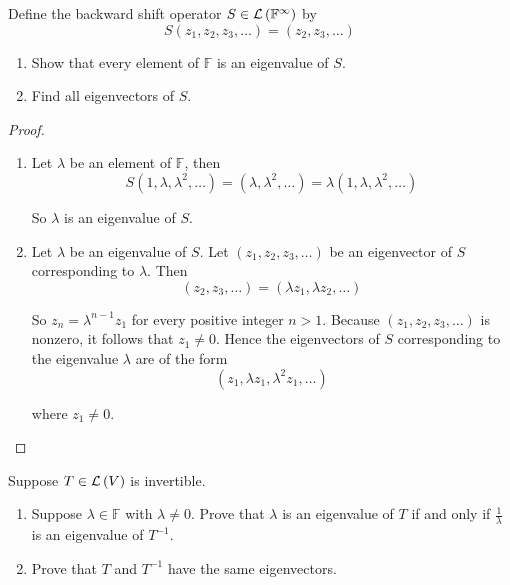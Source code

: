 \begin{exercise}
    Define the backward shift operator $S\in\mathcal{L}\left({\mathbb{F}^{\infty}}\right)$ by
    \[
        S(z_{1}, z_{2}, z_{3}, \ldots) = (z_{2}, z_{3}, \ldots)
    \]

    \begin{enumerate}[label={(\alph*)}]
        \item Show that every element of $\mathbb{F}$ is an eigenvalue of $S$.
        \item Find all eigenvectors of $S$.
    \end{enumerate}
\end{exercise}

\begin{proof}
    \begin{enumerate}[label={(\alph*)}]
        \item Let $\lambda$ be an element of $\mathbb{F}$, then
              \[
                  S(1, \lambda, \lambda^{2}, \ldots) = (\lambda, \lambda^{2}, \ldots) = \lambda (1, \lambda, \lambda^{2}, \ldots)
              \]

              So $\lambda$ is an eigenvalue of $S$.
        \item Let $\lambda$ be an eigenvalue of $S$. Let $(z_{1}, z_{2}, z_{3}, \ldots)$ be an eigenvector of $S$ corresponding to $\lambda$. Then
              \[
                  (z_{2}, z_{3}, \ldots) = (\lambda z_{1}, \lambda z_{2}, \ldots)
              \]

              So $z_{n} = \lambda^{n-1}z_{1}$ for every positive integer $n > 1$. Because $(z_{1}, z_{2}, z_{3}, \ldots)$ is nonzero, it follows that $z_{1}\ne 0$. Hence the eigenvectors of $S$ corresponding to the eigenvalue $\lambda$ are of the form
              \[
                  (z_{1}, \lambda z_{1}, \lambda^{2}z_{1}, \ldots)
              \]

              where $z_{1}\ne 0$.\qedhere
    \end{enumerate}
\end{proof}
\newpage

\begin{exercise}
    Suppose $T\in\mathcal{L}\left({V}\right)$ is invertible.
    \begin{enumerate}[label={(\alph*)}]
        \item Suppose $\lambda\in\mathbb{F}$ with $\lambda \ne 0$. Prove that $\lambda$ is an eigenvalue of $T$ if and only if $\frac{1}{\lambda}$ is an eigenvalue of $T^{-1}$.
        \item Prove that $T$ and $T^{-1}$ have the same eigenvectors.
    \end{enumerate}
\end{exercise}

